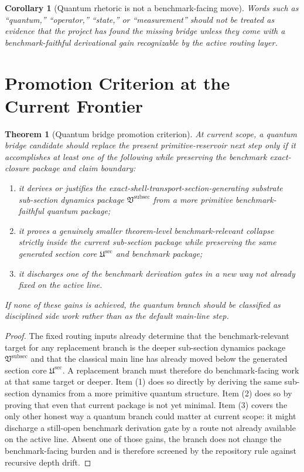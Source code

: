 \documentclass[11pt]{article}
\newcommand{\SubPreSectionCore}{\mathfrak U^{\mathrm{sec}}}
\newcommand{\SubSectionPackage}{\mathfrak V^{\mathrm{subsec}}}
\newtheorem{corollary}{Corollary}
\newtheorem{theorem}{Theorem}
\begin{document}
\begin{corollary}[Quantum rhetoric is not a benchmark-facing move]
Words such as ``quantum,'' ``operator,'' ``state,'' or ``measurement'' should not be treated as evidence that the project has found the missing bridge unless they come with a benchmark-faithful derivational gain recognizable by the active routing layer.
\end{corollary}

\section{Promotion Criterion at the Current Frontier}

\begin{theorem}[Quantum bridge promotion criterion]
At current scope, a quantum bridge candidate should replace the present primitive-reservoir next step only if it accomplishes at least one of the following while preserving the benchmark exact-closure package and claim boundary:
\begin{enumerate}
    \item it derives or justifies the exact-shell-transport-section-generating substrate sub-section dynamics package \(\SubSectionPackage\) from a more primitive benchmark-faithful quantum package;
    \item it proves a genuinely smaller theorem-level benchmark-relevant collapse strictly inside the current sub-section package while preserving the same generated section core \(\SubPreSectionCore\) and benchmark package;
    \item it discharges one of the benchmark derivation gates in a new way not already fixed on the active line.
\end{enumerate}
If none of these gains is achieved, the quantum branch should be classified as disciplined side work rather than as the default main-line step.
\end{theorem}

\begin{proof}
The fixed routing inputs already determine that the benchmark-relevant target for any replacement branch is the deeper sub-section dynamics package \(\SubSectionPackage\) and that the classical main line has already moved below the generated section core \(\SubPreSectionCore\). A replacement branch must therefore do benchmark-facing work at that same target or deeper. Item (1) does so directly by deriving the same sub-section dynamics from a more primitive quantum structure. Item (2) does so by proving that even that current package is not yet minimal. Item (3) covers the only other honest way a quantum branch could matter at current scope: it might discharge a still-open benchmark derivation gate by a route not already available on the active line. Absent one of those gains, the branch does not change the benchmark-facing burden and is therefore screened by the repository rule against recursive depth drift.
\end{proof}
\end{document}
